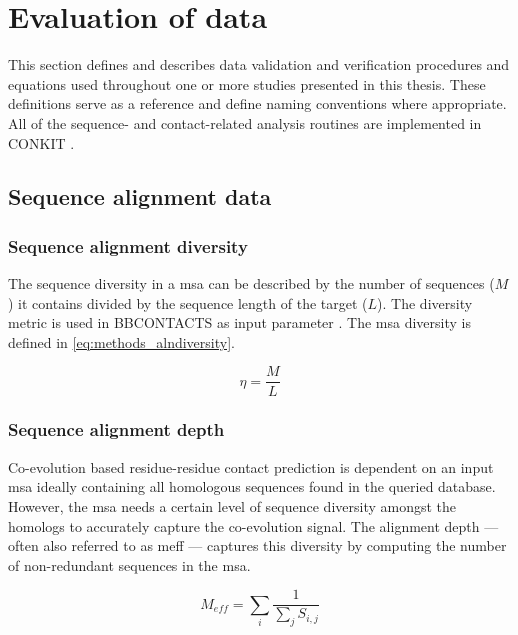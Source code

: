\section{Evaluation of data}
This section defines and describes data validation and verification procedures and equations used throughout one or more studies presented in this thesis. These definitions serve as a reference and define naming conventions where appropriate. All of the sequence- and contact-related analysis routines are implemented in CONKIT \cite{Simkovic2017-us}.

\subsection{Sequence alignment data}
\subsubsection{Sequence alignment diversity}
The sequence diversity in a \gls{msa} can be described by the number of sequences ($M$) it contains divided by the sequence length of the target ($L$). The diversity metric is used in BBCONTACTS as input parameter \cite{Andreani2015-qn}. The \gls{msa} diversity \texteta is defined in \cref{eq:methods_alndiversity}.

\begin{equation}
    \eta=\frac{M}{L}
    \label{eq:methods_alndiversity}
\end{equation}

\subsubsection{Sequence alignment depth}
Co-evolution based residue-residue contact prediction is dependent on an input \gls{msa} ideally containing all homologous sequences found in the queried database. However, the \gls{msa} needs a certain level of sequence diversity amongst the homologs to accurately capture the co-evolution signal. The alignment depth --- often also referred to as \gls{meff} --- captures this diversity by computing the number of non-redundant sequences in the \gls{msa}.

\begin{equation}
    M_{eff}=\sum_{i}\frac{1}{\sum_{j}S_{i,j}}
    \label{eq:methods_meff}
\end{equation}

